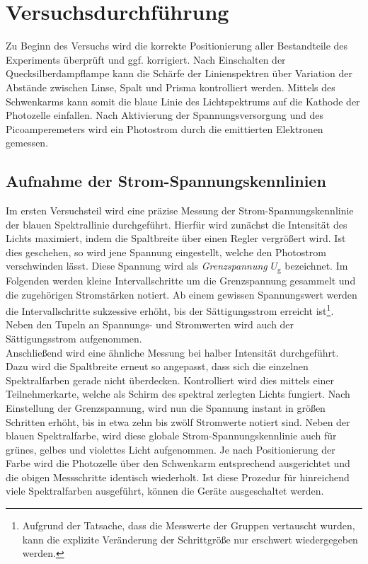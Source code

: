 \section{Versuchsdurchführung}
\label{sec:Versuchsdurchfuehrung}

Zu Beginn des Versuchs wird die korrekte Positionierung aller Bestandteile des Experiments überprüft und ggf. korrigiert. Nach Einschalten der Quecksilberdampflampe
kann die Schärfe der Linienspektren über Variation der Abstände zwischen Linse, Spalt und Prisma kontrolliert werden. Mittels des Schwenkarms kann somit 
die blaue Linie des Lichtspektrums auf die Kathode der Photozelle einfallen. Nach Aktivierung der Spannungsversorgung und des Picoamperemeters wird ein 
Photostrom durch die emittierten Elektronen gemessen. 

\subsection{Aufnahme der Strom-Spannungskennlinien}

Im ersten Versuchsteil wird eine präzise Messung der Strom-Spannungskennlinie der blauen Spektrallinie durchgeführt. Hierfür wird zunächst die Intensität des 
Lichts maximiert, indem die Spaltbreite über einen Regler vergrößert wird. Ist dies geschehen, so wird jene Spannung eingestellt, welche den Photostrom verschwinden
lässt. Diese Spannung wird als \emph{Grenzspannung} $U_\text{g}$ bezeichnet. Im Folgenden werden kleine Intervallschritte um die Grenzspannung gesammelt und 
die zugehörigen Stromstärken notiert. Ab einem gewissen Spannungswert werden die Intervallschritte sukzessive erhöht, bis der Sättigungsstrom erreicht ist\footnote{
Aufgrund der Tatsache, dass die Messwerte der Gruppen vertauscht wurden, kann die explizite Veränderung der Schrittgröße nur erschwert wiedergegeben werden.}. 
Neben den Tupeln an Spannungs- und Stromwerten wird auch der Sättigungsstrom aufgenommen.\\


\noindent Anschließend wird eine ähnliche Messung bei halber Intensität durchgeführt. Dazu wird die Spaltbreite erneut so angepasst, dass sich die einzelnen Spektralfarben
gerade nicht überdecken. Kontrolliert wird dies mittels einer Teilnehmerkarte, welche als Schirm des spektral zerlegten Lichts fungiert. Nach Einstellung 
der Grenzspannung, wird nun die Spannung instant in größen Schritten erhöht, bis in etwa zehn bis zwölf Stromwerte notiert sind. Neben der blauen Spektralfarbe, wird diese 
globale Strom-Spannungskennlinie auch für grünes, gelbes und violettes Licht aufgenommen. Je nach Positionierung der Farbe wird die Photozelle über den 
Schwenkarm entsprechend ausgerichtet und die obigen Messschritte identisch wiederholt. Ist diese Prozedur für hinreichend viele Spektralfarben ausgeführt, 
können die Geräte ausgeschaltet werden. 


